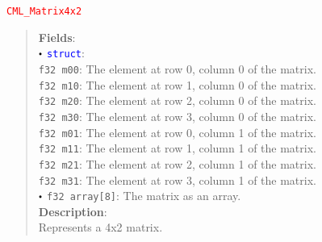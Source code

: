 \documentclass[a4paper,oneside,8pt]{extarticle}
\newcommand{\union}[1]{
  \noindent\textcolor{red}{\texttt{#1}}
  \vspace{-0.3em}
}
\renewcommand{\dot}{\raisebox{0.3ex}{\scalebox{0.6}{$\bullet$}}}
\theoremstyle{definition}
\begin{document}
\union{CML\_Matrix4x2}
\begin{quote}
  \textbf{Fields}: \\
  $\dot$ \textcolor{blue}{\texttt{struct}}: \\
  \indent\hspace{1em} \texttt{f32 m00}: The element at row 0, column 0 of the matrix. \\
  \indent\hspace{1em} \texttt{f32 m10}: The element at row 1, column 0 of the matrix. \\
  \indent\hspace{1em} \texttt{f32 m20}: The element at row 2, column 0 of the matrix. \\
  \indent\hspace{1em} \texttt{f32 m30}: The element at row 3, column 0 of the matrix. \\
  \indent\hspace{1em} \texttt{f32 m01}: The element at row 0, column 1 of the matrix. \\
  \indent\hspace{1em} \texttt{f32 m11}: The element at row 1, column 1 of the matrix. \\
  \indent\hspace{1em} \texttt{f32 m21}: The element at row 2, column 1 of the matrix. \\
  \indent\hspace{1em} \texttt{f32 m31}: The element at row 3, column 1 of the matrix. \\
  $\dot$ \texttt{f32 array[8]}: The matrix as an array. \\

  \vspace{-0.75em}
  \textbf{Description}: \\
  Represents a 4x2 matrix. \\
\end{quote}
\end{document}
